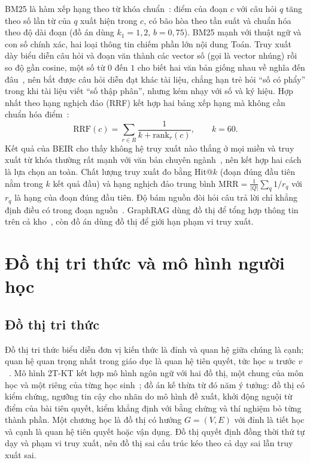 BM25 là hàm xếp hạng theo từ khóa chuẩn~\cite{robertson2009}: điểm của đoạn $c$ với câu hỏi $q$ tăng theo số lần từ của $q$ xuất hiện trong $c$, có bão hòa theo tần suất và chuẩn hóa theo độ dài đoạn (đồ án dùng $k_1=1{,}2$, $b=0{,}75$). BM25 mạnh với thuật ngữ và con số chính xác, hai loại thông tin chiếm phần lớn nội dung Toán. Truy xuất dày biểu diễn câu hỏi và đoạn văn thành các vector số (gọi là vector nhúng) rồi so độ gần cosine, một số từ $0$ đến $1$ cho biết hai văn bản giống nhau về nghĩa đến đâu~\cite{karpukhin2020}, nên bắt được câu hỏi diễn đạt khác tài liệu, chẳng hạn trẻ hỏi ``số có phẩy'' trong khi tài liệu viết ``số thập phân'', nhưng kém nhạy với số và ký hiệu. Hợp nhất theo hạng nghịch đảo (RRF) kết hợp hai bảng xếp hạng mà không cần chuẩn hóa điểm~\cite{cormack2009}:
\begin{equation}
\mathrm{RRF}(c)=\sum_{r\in R}\frac{1}{k+\mathrm{rank}_r(c)},\qquad k=60.
\label{eq:rrf}
\end{equation}
Kết quả của BEIR cho thấy không hệ truy xuất nào thắng ở mọi miền và truy xuất từ khóa thường rất mạnh với văn bản chuyên ngành~\cite{thakur2021}, nên kết hợp hai cách là lựa chọn an toàn. Chất lượng truy xuất đo bằng Hit@$k$ (đoạn đúng đầu tiên nằm trong $k$ kết quả đầu) và hạng nghịch đảo trung bình $\mathrm{MRR}=\frac{1}{|Q|}\sum_{q}1/r_q$ với $r_q$ là hạng của đoạn đúng đầu tiên. Độ bám nguồn đòi hỏi câu trả lời chỉ khẳng định điều có trong đoạn nguồn~\cite{rashkin2023,es2024}. GraphRAG dùng đồ thị để tổng hợp thông tin trên cả kho~\cite{edge2024}, còn đồ án dùng đồ thị để giới hạn phạm vi truy xuất.

\section{Đồ thị tri thức và mô hình người học}

\subsection{Đồ thị tri thức}
Đồ thị tri thức biểu diễn đơn vị kiến thức là đỉnh và quan hệ giữa chúng là cạnh; quan hệ quan trọng nhất trong giáo dục là quan hệ tiên quyết, tức học $u$ trước $v$~\cite{doignon1999}. Mô hình 2T-KT kết hợp mô hình ngôn ngữ với hai đồ thị, một chung của môn học và một riêng của từng học sinh~\cite{li2026}; đồ án kế thừa từ đó năm ý tưởng: đồ thị có kiểm chứng, ngưỡng tin cậy cho nhãn do mô hình đề xuất, khởi động nguội từ điểm của bài tiên quyết, kiểm khẳng định với bằng chứng và thí nghiệm bỏ từng thành phần. Một chương học là đồ thị có hướng $G=(V,E)$ với đỉnh là tiết học và cạnh là quan hệ tiên quyết hoặc vận dụng. Đồ thị quyết định đồng thời thứ tự dạy và phạm vi truy xuất, nên đồ thị sai cấu trúc kéo theo cả dạy sai lẫn truy xuất sai.

